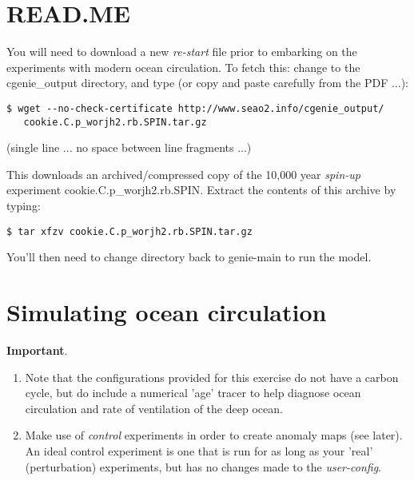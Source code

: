 \newpage

\section*{READ.ME}

You will need to download a new \textit{re-start} file prior to embarking on the experiments with modern ocean circulation.
To fetch this: change to the \textsf{\footnotesize cgenie\_output} directory, and type (or copy and paste carefully from the PDF ...):

\vspace{-2mm}\small\begin{verbatim}
$ wget --no-check-certificate http://www.seao2.info/cgenie_output/
   cookie.C.p_worjh2.rb.SPIN.tar.gz
\end{verbatim}\normalsize\vspace{-2mm}
(single line ... no space between line fragments ...)

\vspace{1mm}
This downloads an archived/compressed copy of the 10,000 year \textit{spin-up} experiment \textsf{\footnotesize  cookie.C.p\_worjh2.rb.SPIN}. Extract the contents of this archive by typing:

\vspace{-2mm}
\begin{verbatim}
$ tar xfzv cookie.C.p_worjh2.rb.SPIN.tar.gz
\end{verbatim}
\vspace{-2mm}

You’ll then need to change directory back to \textsf{\footnotesize genie-main} to run the model.

\newpage

\section{Simulating ocean circulation}

\textbf{Important}.

\begin{enumerate}[noitemsep]
\vspace{1mm}
\item Note that the configurations provided for this exercise do not have a carbon cycle, but do include a numerical 'age' tracer to help diagnose ocean circulation and rate of ventilation of the deep ocean.
\vspace{1mm}
\item Make use of \textit{control} experiments in order to create anomaly maps (see later). An ideal control experiment is one that is run for as long as your 'real' (perturbation) experiments, but has no changes made to the \textit{user-config}.
\end{enumerate}

